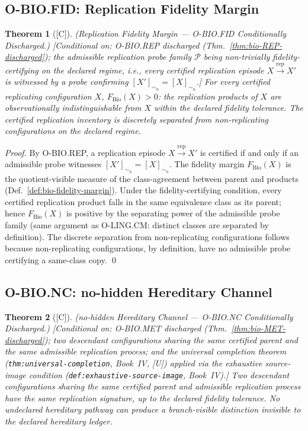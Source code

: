 \documentclass[12pt,oneside]{amsbook}
\theoremstyle{plain}
\newtheorem{theorem}{Theorem}[section]
\theoremstyle{definition}
\theoremstyle{remark}
\newcommand{\status}[1]{\textup{[#1]}}
\begin{document}
\subsection{O-BIO.FID: Replication Fidelity Margin}\label{sec:bio-FID-discharge}

\begin{theorem}[\status{C}]\label{thm:bio-FID-discharged}
\textup{(Replication Fidelity Margin --- O-BIO.FID Conditionally Discharged.)}
\textup{[Conditional on: O-BIO.REP discharged
(Thm.~\ref{thm:bio-REP-discharged}); the admissible replication probe
family $\mathcal{P}$ being non-trivially fidelity-certifying on the
declared regime, i.e., every certified replication episode
$X \xrightarrow{\mathrm{rep}} X'$ is witnessed by a probe confirming
$[X']_{\sim_n} = [X]_{\sim_n}$.]}
For every certified replicating configuration $X$,
$F_{\mathrm{Bio}}(X) > 0$: the replication products of $X$ are
observationally indistinguishable from $X$ within the declared fidelity
tolerance. The certified replication inventory is discretely separated
from non-replicating configurations on the declared regime.
\end{theorem}

\begin{proof}
By O-BIO.REP, a replication episode $X \xrightarrow{\mathrm{rep}} X'$
is certified if and only if an admissible probe witnesses
$[X']_{\sim_n} = [X]_{\sim_n}$. The fidelity margin
$F_{\mathrm{Bio}}(X)$ is the quotient-visible measure of the
class-agreement between parent and products
(Def.~\ref{def:bio-fidelity-margin}). Under the fidelity-certifying
condition, every certified replication product falls in the same
equivalence class as its parent; hence $F_{\mathrm{Bio}}(X)$ is
positive by the separating power of the admissible probe family
(same argument as O-LING.CM: distinct classes are separated by
definition). The discrete separation from non-replicating
configurations follows because non-replicating configurations, by
definition, have no admissible probe certifying a same-class copy.
\qed
\end{proof}

\subsection{O-BIO.NC: no-hidden Hereditary Channel}\label{sec:bio-NC-discharge}

\begin{theorem}[\status{C}]\label{thm:bio-NC-discharged}
\textup{(no-hidden Hereditary Channel --- O-BIO.NC Conditionally Discharged.)}
\textup{[Conditional on: O-BIO.MET discharged
(Thm.~\ref{thm:bio-MET-discharged}); two descendant configurations
sharing the same certified parent and the same admissible replication
process; and the universal completion theorem
(\texttt{thm:universal-completion}, Book~IV, [U]) applied via the
exhaustive source-image condition
(\texttt{def:exhaustive-source-image}, Book~IV).]}
Two descendant configurations sharing the same certified parent and
admissible replication process have the same replication signature,
up to the declared fidelity tolerance. No undeclared hereditary
pathway can produce a branch-visible distinction invisible to the
declared hereditary ledger.
\end{theorem}
\end{document}
